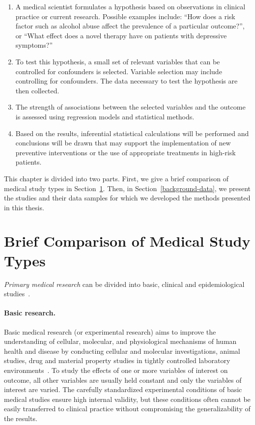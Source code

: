 \documentclass[
  oneside]{book}
\providecommand{\tightlist}{%
  \setlength{\itemsep}{0pt}\setlength{\parskip}{0pt}}
\begin{document}
\begin{enumerate}
\def\labelenumi{(\arabic{enumi})}
\tightlist
\item
  A medical scientist formulates a hypothesis based on observations in clinical practice or current research. Possible examples include: ``How does a risk factor such as alcohol abuse affect the prevalence of a particular outcome?'', or ``What effect does a novel therapy have on patients with depressive symptoms?''
\item
  To test this hypothesis, a small set of relevant variables that can be controlled for confounders is selected. Variable selection may include controlling for confounders. The data necessary to test the hypothesis are then collected.
\item
  The strength of associations between the selected variables and the outcome is assessed using regression models and statistical methods.
\item
  Based on the results, inferential statistical calculations will be performed and conclusions will be drawn that may support the implementation of new preventive interventions or the use of appropriate treatments in high-risk patients.
\end{enumerate}

This chapter is divided into two parts.
First, we give a brief comparison of medical study types in Section~\ref{background-med-research}.
Then, in Section~\ref{background-data}, we present the studies and their data samples for which we developed the methods presented in this thesis.

\hypertarget{background-med-research}{%
\section{Brief Comparison of Medical Study Types}\label{background-med-research}}

\emph{Primary medical research} can be divided into basic, clinical and epidemiological studies~\autocite{thiese2014observational,Roehrig:Arztebl2009}.

\paragraph*{Basic research.}

Basic medical research (or experimental research) aims to improve the understanding of cellular, molecular, and physiological mechanisms of human health and disease by conducting cellular and molecular investigations, animal studies, drug and material property studies in tightly controlled laboratory environments~\autocite{Roehrig:Arztebl2009}.
To study the effects of one or more variables of interest on outcome, all other variables are usually held constant and only the variables of interest are varied.
The carefully standardized experimental conditions of basic medical studies ensure high internal validity, but these conditions often cannot be easily transferred to clinical practice without compromising the generalizability of the results.
\end{document}
